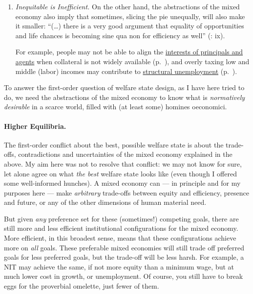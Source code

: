 \begin{enumerate}
\begin{enumerate}
		\item \emph{Inequitable is Inefficient.} On the other hand, the abstractions of the mixed economy also imply that sometimes, slicing the pie unequally, will also make it smaller: ``(\ldots) there is a very good argument that equality of opportunities and life chances is becoming sine qua non for efficiency as well'' (\citealt{Esping-Andersen2002}: ix).
		
		For example, people may not be able to align the \hyperref[sec:principal-agent-problem]{interests of principals and agents} when collateral is not widely available (p.~\pageref{sec:principal-agent-problem}), and overly taxing low and middle (labor) incomes may contribute to \hyperref[sec:minimal-DWL]{structural unemployment} (p.~\pageref{sec:minimal-DWL}).
	\end{enumerate}
	
	To answer the first-order question of welfare state design, as I have here tried to do, we need the abstractions of the mixed economy to know what is \emph{normatively desirable} in a scarce world, filled with (at least some) homines oeconomici.	
\end{enumerate}

\paragraph[Higher Equilibria]{Higher Equilibria.} The first-order conflict about the best, possible welfare state is about the trade-offs, contradictions and uncertainties of the mixed economy explained in the above. My aim here was not to resolve that conflict: we may not know for sure, let alone agree on what \emph{the best} welfare state looks like (even though I offered some well-informed hunches). A mixed economy can --- in principle and for my purposes here --- make \emph{arbitrary} trade-offs between equity and efficiency, presence and future, or any of the other dimensions of human material need. 


But given \emph{any} preference set for these (sometimes!) competing goals, there are still more and less efficient institutional configurations for the mixed economy. More efficient, in this broadest sense, means that these configurations achieve more on \emph{all} goals. These preferable mixed economies will still trade off preferred goals for less preferred goals, but the trade-off will be less harsh. For example, a \gls{NIT} may achieve the same, if not more equity than a minimum wage, but at much lower cost in growth, or unemployment. Of course, you still have to break eggs for the proverbial omelette, just fewer of them.

